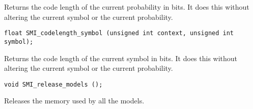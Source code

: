 \documentclass[11pt]{article}
\begin{document}
{\vspace{-0.2cm}
Returns the code length of the current probability in bits. It does this without
altering the current symbol or the current probability.

\begin{verbatim}
float SMI_codelength_symbol (unsigned int context, unsigned int symbol);
\end{verbatim}

\vspace{-0.2cm}
Returns the code length of the current symbol in bits. It does this without
altering the current symbol or the current probability.

\begin{verbatim}
void SMI_release_models ();
\end{verbatim}

\vspace{-0.2cm}
Releases the memory used by all the models.
}
\end{document}
